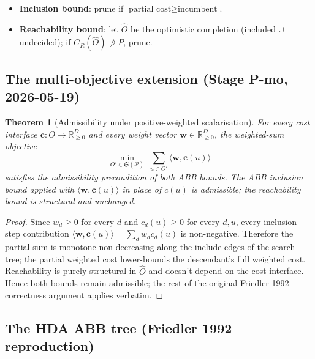 \documentclass[11pt,a4paper]{article}
\theoremstyle{plain}
\newtheorem{theorem}{Theorem}
\theoremstyle{definition}
\newcommand{\bw}{\boldsymbol{w}}
\newcommand{\bc}{\boldsymbol{c}}
\begin{document}
\begin{itemize}
\item \textbf{Inclusion bound}: prune if
      $\text{partial cost} \geq \text{incumbent}$.
\item \textbf{Reachability bound}: let $\widehat{O}$ be the
      optimistic completion (included $\cup$ undecided); if
      $C_R(\widehat{O}) \not\supseteq P$, prune.
\end{itemize}

\subsection{The multi-objective extension (Stage P-mo, 2026-05-19)}

\begin{theorem}[Admissibility under positive-weighted scalarisation]
For every cost interface $\bc : O \to \mathbb{R}_{\geq 0}^D$ and
every weight vector $\bw \in \mathbb{R}_{\geq 0}^D$, the
weighted-sum objective
\[
\min_{O' \in \mathfrak{S}(\mathcal{P})}\; \sum_{u \in O'}
\langle \bw, \bc(u) \rangle
\]
satisfies the admissibility precondition of both ABB bounds. The
ABB inclusion bound applied with $\langle \bw, \bc(u) \rangle$
in place of $c(u)$ is admissible; the reachability bound is
structural and unchanged.
\end{theorem}

\begin{proof}[Proof]
Since $w_d \geq 0$ for every $d$ and $c_d(u) \geq 0$ for every
$d, u$, every inclusion-step contribution
$\langle \bw, \bc(u) \rangle = \sum_d w_d c_d(u)$ is non-negative.
Therefore the partial sum is monotone non-decreasing along the
include-edges of the search tree; the partial weighted cost
lower-bounds the descendant's full weighted cost. Reachability is
purely structural in $\widehat{O}$ and doesn't depend on the
cost interface. Hence both bounds remain admissible; the rest
of the original Friedler 1992 correctness argument applies
verbatim.
\end{proof}

\subsection{The HDA ABB tree (Friedler 1992 reproduction)}
\end{document}

